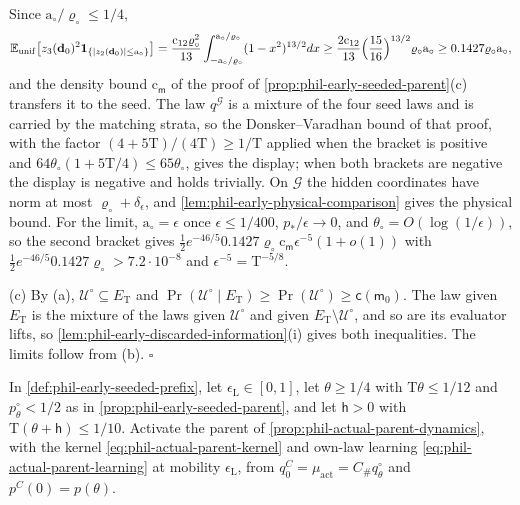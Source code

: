 Since \(\mathrm a_\circ/\varrho_\circ\le1/4\),
\[
 \mathbb E_{\mathrm{unif}}\bigl[z_3(\mathbf d_0)^2
   \mathbf 1_{\{|z_2(\mathbf d_0)|\le\mathrm a_\circ\}}\bigr]
 =\frac{\mathrm c_{12}\varrho_\circ^2}{13}
   \int_{-\mathrm a_\circ/\varrho_\circ}^{\mathrm a_\circ/\varrho_\circ}
   (1-x^2)^{13/2}dx
 \ge\frac{2\mathrm c_{12}}{13}\Bigl(\frac{15}{16}\Bigr)^{13/2}
   \varrho_\circ\mathrm a_\circ
 \ge0.1427\varrho_\circ\mathrm a_\circ,
\]
and the density bound \(\mathrm c_{\mathsf m}\) of the proof of
\cref{prop:phil-early-seeded-parent}(c) transfers it to the seed. The law
\(q^{\mathscr G}\) is a mixture of the four seed laws and is carried by the
matching strata, so the Donsker--Varadhan bound of that proof, with the factor
\((4+5\mathrm T)/(4\mathrm T)\ge1/\mathrm T\) applied when the bracket is
positive and \(64\theta_\circ(1+5\mathrm T/4)\le65\theta_\circ\), gives the
display; when both brackets are negative the display is negative and holds
trivially. On \(\mathscr G\) the hidden coordinates have norm at most
\(\varrho_\circ+\delta_\epsilon\), and
\cref{lem:phil-early-physical-comparison} gives the physical bound. For the
limit, \(\mathrm a_\circ=\epsilon\) once \(\epsilon\le1/400\),
\(p_*/\epsilon\to0\), and \(\theta_\circ=O(\log(1/\epsilon))\), so the second
bracket gives
\(\frac12e^{-46/5}0.1427\varrho_\circ\mathrm c_{\mathsf m}\epsilon^{-5}(1+o(1))\)
with \(\frac12e^{-46/5}0.1427\varrho_\circ>7.2\cdot10^{-8}\) and
\(\epsilon^{-5}=\mathrm T^{-5/8}\).

(c) By (a), \(\mathscr U^\circ\subseteq E_{\mathrm T}\) and
\(\Pr(\mathscr U^\circ\mid E_{\mathrm T})\ge\Pr(\mathscr U^\circ)\ge
\mathsf c(\mathsf m_0)\). The law given \(E_{\mathrm T}\) is the mixture of
the laws given \(\mathscr U^\circ\) and given
\(E_{\mathrm T}\setminus\mathscr U^\circ\), and so are its evaluator lifts,
so \cref{lem:phil-early-discarded-information}(i) gives both inequalities.
The limits follow from (b). \(\square\)

In \cref{def:phil-early-seeded-prefix}, let \(\epsilon_{\mathrm L}\in[0,1]\),
let \(\theta\ge1/4\) with \(\mathrm T\theta\le1/12\) and
\(p^\circ_\theta<1/2\) as in \cref{prop:phil-early-seeded-parent}, and let
\(\mathsf h>0\) with \(\mathrm T(\theta+\mathsf h)\le1/10\). Activate the parent
of \cref{prop:phil-actual-parent-dynamics}, with the kernel
\cref{eq:phil-actual-parent-kernel} and own-law learning
\cref{eq:phil-actual-parent-learning} at mobility \(\epsilon_{\mathrm L}\), from
\(q^C_0=\mu_{\mathrm{act}}=C_\#q^\circ_\theta\) and \(p^C(0)=p(\theta)\).

